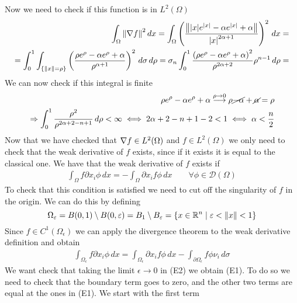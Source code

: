 Now we need to check if this function is in \(L^2(\Omega)\)
\[
    \begin{split}
        \int_\Omega \norm{\nabla f}^2 \, dx = \int_\Omega \left(\frac{\norm{\abs{x} e^{\abs{x}} - \alpha e^{\abs{x}} + \alpha}}{\abs{x}^{2\alpha + 1}}\right)^2 \, dx = \\
        = \int_0^1 \int_{\left\{\norm{x} = \rho\right\}} \left(\frac{\rho e^{\rho} - \alpha e^{\rho} + \alpha}{\rho^{\alpha + 1}}\right)^2 \, d\sigma \, d\rho = \sigma_n \int_0^1 \frac{\left(\rho e^{\rho} - \alpha e^{\rho} + \alpha\right)^2}{\rho^{2\alpha + 2}} \rho^{n-1} \, d\rho = \\
    \end{split}
\]
We can now check if this integral is finite
\[
    \begin{split}
        \rho e^{\rho} - \alpha e^{\rho} + \alpha \overset{\rho \to 0}{\longrightarrow} \rho \cancel{-\alpha} + \cancel{\alpha} = \rho \\
        \Rightarrow \int_0^1 \frac{\rho^2}{\rho^{2\alpha + 2 - n + 1}} \, d\rho < \infty \iff 2\alpha + 2 - n + 1 - 2 < 1 \iff \alpha < \frac{n}{2}
    \end{split}
\]
Now that we have checked that \(\nabla f \in L^2(\Omega)\) and \(f \in L^2(\Omega)\) we only need to check that the weak derivative of \(f\) exists, since if it exists it is equal to the classical one. We have that the weak derivative of \(f\) exists if
\[
    \begin{split}
        \int_\Omega f \partial x_i \phi \, dx = - \int_\Omega \partial x_i f \phi \, dx \qquad \forall \phi \in \mathcal{D}(\Omega)
    \end{split}
    \tag*{E1}
\]
To check that this condition is satisfied we need to cut off the singularity of \(f\) in the origin. We can do this by defining
\[
    \Omega_\varepsilon = B(0, 1) \setminus B(0, \varepsilon) = B_1 \setminus B_\varepsilon = \left\{ x \in \mathbb{R}^n \mid \varepsilon < \norm{x} < 1 \right\}
\]
Since \(f \in C^1(\Omega_\epsilon)\) we can apply the divergence theorem to the weak derivative definition and obtain
\[
    \begin{split}
        \int_{\Omega_\epsilon} f \partial x_i \phi \, dx = \int_{\Omega_\epsilon} \partial x_i f \phi \, dx - \int_{\partial\Omega_\epsilon} f \phi \nu_i \, d\sigma
    \end{split}
    \tag*{E2}
\]
We want check that taking the limit \(\epsilon \to 0\) in (E2) we obtain (E1). To do so we need to check that the boundary term goes to zero, and the other two terms are equal at the ones in (E1). We start with the first term

